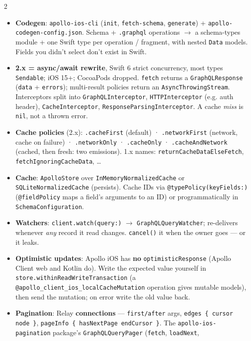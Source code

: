 \documentclass[8pt]{extarticle}
\newcommand\ct[1]{\texttt{#1}}
\newcommand\hd[1]{\par\vspace{3pt}\noindent{\bfseries\color{sheetBlue}#1}\par\vspace{1pt}}
\begin{document}
\begin{multicols}{2}
\hd{Apollo iOS — the moving parts}
\begin{itemize}
  \item \textbf{Codegen}: \ct{apollo-ios-cli} (\ct{init}, \ct{fetch-schema}, \ct{generate}) +
        \ct{apollo-codegen-config.json}. Schema + \ct{.graphql} operations $\to$ a schema-types module +
        one Swift type per operation / fragment, with nested \ct{Data} models. Fields you didn't select
        don't exist in Swift.
  \item \textbf{2.x = async/await rewrite}, Swift 6 strict concurrency, most types \ct{Sendable};
        iOS 15+; CocoaPods dropped. \ct{fetch} returns a \ct{GraphQLResponse} (\ct{data} +
        \ct{errors}); multi-result policies return an \ct{AsyncThrowingStream}. Interceptors split into
        \ct{GraphQLInterceptor}, \ct{HTTPInterceptor} (e.g. auth header), \ct{CacheInterceptor},
        \ct{ResponseParsingInterceptor}. A cache \emph{miss} is \ct{nil}, not a thrown error.
  \item \textbf{Cache policies} (2.x): \ct{.cacheFirst} (default) · \ct{.networkFirst} (network, cache
        on failure) · \ct{.networkOnly} · \ct{.cacheOnly} · \ct{.cacheAndNetwork} (cached, then fresh:
        two emissions). 1.x names: \ct{returnCacheDataElseFetch}, \ct{fetchIgnoringCacheData}, \ldots
  \item \textbf{Cache}: \ct{ApolloStore} over \ct{InMemoryNormalizedCache} or \ct{SQLiteNormalizedCache}
        (persists). Cache IDs via \ct{@typePolicy(keyFields:)} (\ct{@fieldPolicy} maps a field's
        arguments to an ID) or programmatically in \ct{SchemaConfiguration}.
  \item \textbf{Watchers}: \ct{client.watch(query:)} $\to$ \ct{GraphQLQueryWatcher}; re-delivers
        whenever \emph{any} record it read changes. \ct{cancel()} it when the owner goes — or it leaks.
  \item \textbf{Optimistic updates}: Apollo iOS has \textbf{no} \ct{optimisticResponse} (Apollo Client
        web and Kotlin do). Write the expected value yourself in
        \ct{store.withinReadWriteTransaction} (a \ct{@apollo\_client\_ios\_localCacheMutation}
        operation gives mutable models), then send the mutation; on error write the old value back.
  \item \textbf{Pagination}: Relay \textbf{connections} — \ct{first/after} args,
        \ct{edges \{ cursor node \}}, \ct{pageInfo \{ hasNextPage endCursor \}}. The
        \ct{apollo-ios-pagination} package's \ct{GraphQLQueryPager} (\ct{fetch}, \ct{loadNext},

\end{itemize}
\end{multicols}
\end{document}
